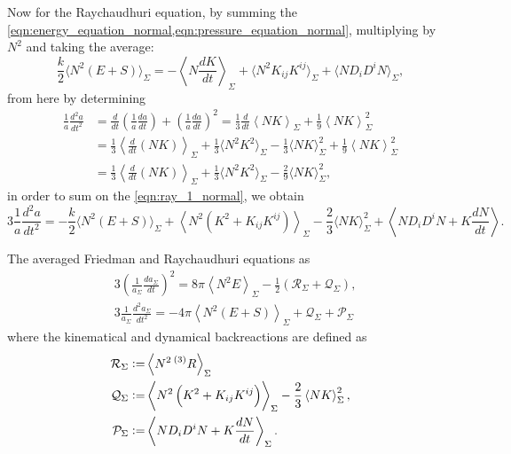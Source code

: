 Now for the Raychaudhuri equation, by summing the \cref{eqn:energy_equation_normal,eqn:pressure_equation_normal}, multiplying by $N^2$ and taking the average:
\begin{equation}
    \frac{k}{2}\langle N^2(E+S)\rangle_\Sigma=-\left\langle N\frac{dK}{dt}\right\rangle_\Sigma+\langle N^2K_{ij}K^{ij}\rangle_\Sigma+\langle ND_iD^iN\rangle_\Sigma,
    \label{eqn:ray_1_normal}
\end{equation}
from here by determining
\begin{align}
    \frac{1}{a}\frac{d^2a}{dt^2}&=\frac{d}{dt}\left(\frac{1}{a}\frac{da}{dt}\right)+\left(\frac{1}{a}\frac{da}{dt}\right)^2=\frac{1}{3}\frac{d}{dt}\left\langle NK \right\rangle_{\Sigma}+\frac{1}{9}\left\langle NK \right\rangle_{\Sigma}^2\nonumber\\
    &=\frac{1}{3}\left\langle \frac{d}{dt}(NK) \right\rangle_{\Sigma}+\frac{1}{3}\langle N^2K^2\rangle_{\Sigma}-\frac{1}{3}\langle NK\rangle^2_\Sigma+\frac{1}{9}\left\langle NK \right\rangle_{\Sigma}^2\nonumber\\
    &=\frac{1}{3}\left\langle \frac{d}{dt}(NK) \right\rangle_{\Sigma}+\frac{1}{3}\langle N^2K^2\rangle_{\Sigma}-\frac{2}{9}\langle NK\rangle^2_\Sigma,
    \label{eqn:useful_51}
\end{align}
in order to sum on the \cref{eqn:ray_1_normal}, we obtain
\begin{equation}
    3\frac{1}{a}\frac{d^2a}{dt^2}=-\frac{k}{2}\langle N^2(E+S)\rangle_\Sigma+\left\langle N^2(K^2+K_{ij}K^{ij})\right\rangle_{\Sigma}-\frac{2}{3}\langle NK\rangle^2_\Sigma+\left\langle ND_iD^i N+K\frac{dN}{dt}\right\rangle.\nonumber
\end{equation}





The averaged Friedman and Raychaudhuri equations as
\begin{align}
    &3\left(\frac{1}{a_\Sigma}\frac{da_\Sigma}{dt}\right)^2=8\pi\left\langle N^2E\right\rangle_{\Sigma}-\frac{1}{2}\left(\mathcal{R}_\Sigma+\mathcal{Q}_{\Sigma}\right),\label{eqn:friedman_eqs_jf_1}\\
    &3\frac{1}{a_{\Sigma}}\frac{d^2a_{\Sigma}}{dt^2}=-4\pi\left\langle N^2(E+S)\right\rangle_{\Sigma}+\mathcal{Q}_{\Sigma}+\mathcal{P}_{\Sigma}\label{eqn:raychaud_eqs_jf_1}
\end{align}
where the kinematical and dynamical backreactions are defined as
\begin{align}
    \mathcal{R}_\Sigma :=&\left\langle N^2 \prescript{(3)}{}{R}\right\rangle_{\Sigma}\\
    \mathcal{Q}_{\Sigma}:=& \left\langle N^2\left(K^2+K_{ij}K^{ij}\right)\right\rangle_{\Sigma}-\frac{2}{3}\left\langle NK\right\rangle_{\Sigma}^2, \\
    \mathcal{P}_{\Sigma}:= &\left\langle N D_i D^i N+K\frac{dN}{dt}\right\rangle_{\Sigma}.
\end{align}




